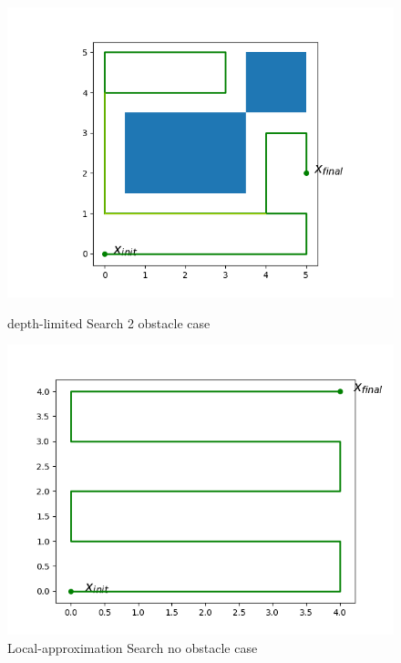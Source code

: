 \documentclass{article}
\begin{document}
\begin{normalsize}
\begin{figure}
\begin{minipage}{.33\textwidth}
      \includegraphics[width=\linewidth]{deliverables/DLS_2_obs.png}
      \caption{depth-limited Search 2 obstacle case }
    \end{minipage}
        \begin{minipage}{.33\textwidth}
      \centering
      \includegraphics[width=\linewidth]{deliverables/LAS_no_obs.png}
      \caption{Local-approximation Search no obstacle case }
    \end{minipage}%
            \begin{minipage}{.33\textwidth}
      \centering

\end{minipage}
\end{figure}
\end{normalsize}
\end{document}
